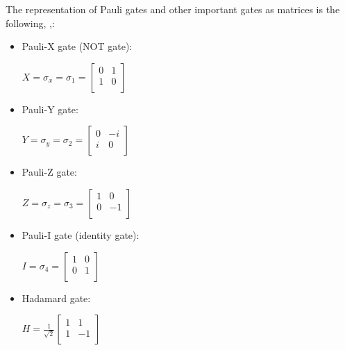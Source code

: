 \documentclass[inscr,ack,preface]{diphdthesis}
\begin{document}
The representation of Pauli gates and other important gates as matrices is the following, \cite{niel},:
\begin{itemize}
    \item Pauli-X gate (NOT gate):
    \begin{center}
    \Large
        $X = \sigma_x = \sigma_1 = 
        \begin{bmatrix}
            0 & 1 \\
            1 & 0 \\
        \end{bmatrix}$
    \end{center}
    \normalsize
    \item Pauli-Y gate:
    \begin{center}
    \Large
        $Y = \sigma_y = \sigma_2 = 
        \begin{bmatrix}
            0 & -i \\
            i & 0 \\
        \end{bmatrix}$
    \end{center}
    \normalsize
    \item Pauli-Z gate:
    \begin{center}
    \Large
        $Z = \sigma_z = \sigma_3 = 
        \begin{bmatrix}
            1 & 0 \\
            0 & -1 \\
        \end{bmatrix}$
    \end{center}
    \normalsize
    \item Pauli-I gate (identity gate):
    \begin{center}
    \Large
        $I =  \sigma_4 = 
        \begin{bmatrix}
            1 & 0 \\
            0 & 1 \\
        \end{bmatrix}$
    \end{center}
    \item Hadamard gate:
    \begin{center}
    \Large
        $H = \frac{1}{\sqrt{2}}\begin{bmatrix}
            1 & 1 \\
            1 & -1 \\
            \end{bmatrix}$
    \end{center}
    
\end{itemize}
\end{document}
